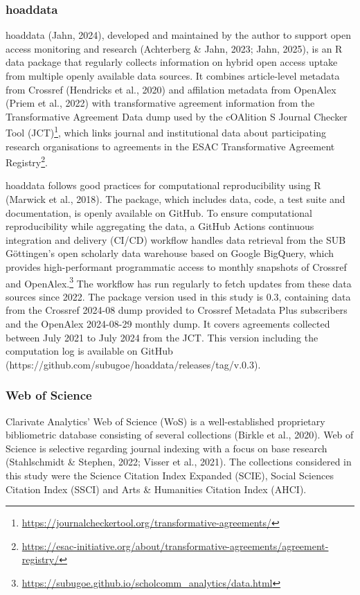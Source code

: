 \documentclass[a4paper,man,floatsintext,longtable,noextraspace,10pt]{apa6}
\begin{document}
\subsubsection{hoaddata}\label{hoaddata}

hoaddata (Jahn, 2024), developed and maintained by the author to support
open access monitoring and research (Achterberg \& Jahn, 2023; Jahn,
2025), is an R data package that regularly collects information on
hybrid open access uptake from multiple openly available data sources.
It combines article-level metadata from Crossref (Hendricks et al.,
2020) and affilation metadata from OpenAlex (Priem et al., 2022) with
transformative agreement information from the Transformative Agreement
Data dump used by the cOAlition S Journal Checker Tool (JCT)\footnote{\url{https://journalcheckertool.org/transformative-agreements/}},
which links journal and institutional data about participating research
organisations to agreements in the ESAC Transformative Agreement
Registry\footnote{\url{https://esac-initiative.org/about/transformative-agreements/agreement-registry/}}.

hoaddata follows good practices for computational reproducibility using
R (Marwick et al., 2018). The package, which includes data, code, a test
suite and documentation, is openly available on GitHub. To ensure
computational reproducibility while aggregating the data, a GitHub
Actions continuous integration and delivery (CI/CD) workflow handles
data retrieval from the SUB Göttingen's open scholarly data warehouse
based on Google BigQuery, which provides high-performant programmatic
access to monthly snapshots of Crossref and OpenAlex.\footnote{\url{https://subugoe.github.io/scholcomm_analytics/data.html}}
The workflow has run regularly to fetch updates from these data sources
since 2022. The package version used in this study is 0.3, containing
data from the Crossref 2024-08 dump provided to Crossref Metadata Plus
subscribers and the OpenAlex 2024-08-29 monthly dump. It covers
agreements collected between July 2021 to July 2024 from the JCT. This
version including the computation log is available on GitHub
(https://github.com/subugoe/hoaddata/releases/tag/v.0.3).

\subsubsection{Web of Science}\label{web-of-science}

Clarivate Analytics' Web of Science (WoS) is a well-established
proprietary bibliometric database consisting of several collections
(Birkle et al., 2020). Web of Science is selective regarding journal
indexing with a focus on base research (Stahlschmidt \& Stephen, 2022;
Visser et al., 2021). The collections considered in this study were the
Science Citation Index Expanded (SCIE), Social Sciences Citation Index
(SSCI) and Arts \& Humanities Citation Index (AHCI).
\end{document}
